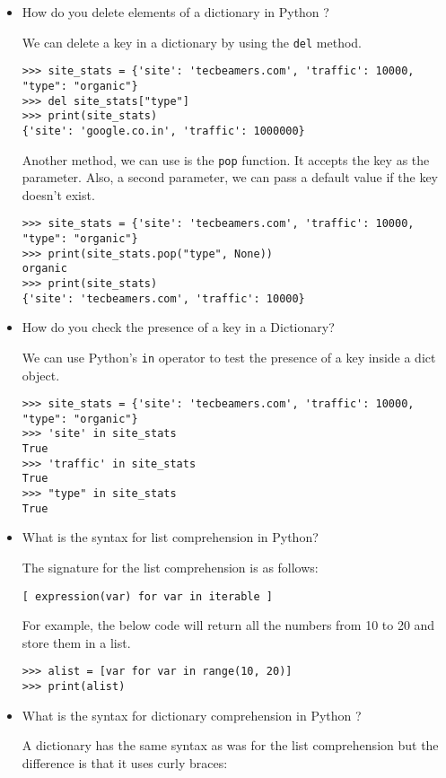 \documentclass[11pt]{article}
\begin{document}
\begin{itemize}
\item How do you delete elements of a dictionary in Python ?
  
  We can delete a key in a dictionary by using the \verb;del; method.

\begin{verbatim}
>>> site_stats = {'site': 'tecbeamers.com', 'traffic': 10000, "type": "organic"}
>>> del site_stats["type"]
>>> print(site_stats)
{'site': 'google.co.in', 'traffic': 1000000}
\end{verbatim}

Another method, we can use is the \verb;pop; function. It accepts the key as the parameter. Also, a second parameter, we can pass a default value if the key doesn’t exist.

\begin{verbatim}
>>> site_stats = {'site': 'tecbeamers.com', 'traffic': 10000, "type": "organic"}
>>> print(site_stats.pop("type", None))
organic
>>> print(site_stats)
{'site': 'tecbeamers.com', 'traffic': 10000}
\end{verbatim}

\item How do you check the presence of a key in a Dictionary?
  
  We can use Python’s \verb;in; operator to test the presence of a key inside a dict object.

\begin{verbatim}
>>> site_stats = {'site': 'tecbeamers.com', 'traffic': 10000, "type": "organic"}
>>> 'site' in site_stats
True
>>> 'traffic' in site_stats
True
>>> "type" in site_stats
True
\end{verbatim}

\item What is the syntax for list comprehension in Python?
  
  The signature for the list comprehension is as follows:

\verb;[ expression(var) for var in iterable ];

For example, the below code will return all the numbers from 10 to 20 and store them in a list.

\begin{verbatim}
>>> alist = [var for var in range(10, 20)]
>>> print(alist)
\end{verbatim}

\item What is the syntax for dictionary comprehension in Python ?
  
  A dictionary has the same syntax as was for the list comprehension but the difference is that it uses curly braces:


\end{itemize}
\end{document}
